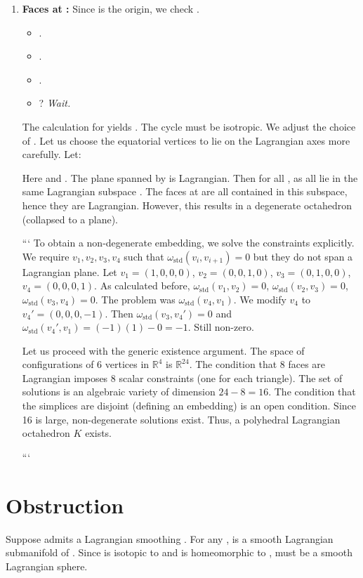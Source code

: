 \documentclass[11pt]{article}
\theoremstyle{definition}
\newcommand{\R}{\mathbb{R}}
\newcommand{\omegaStd}{\omega_{\mathrm{std}}}
\begin{document}
\begin{enumerate}
\item \textbf{Faces at :} Since  is the origin, we check .
\begin{itemize}
\item .
\item .
\item .
\item ? \emph{Wait.}
\end{itemize}
The calculation for  yields . The cycle  must be isotropic. We adjust the choice of .
Let us choose the equatorial vertices to lie on the Lagrangian axes more carefully. Let:



Here  and . The plane spanned by  is Lagrangian.
Then  for all , as all  lie in the same Lagrangian subspace .
The faces at  are all contained in this subspace, hence they are Lagrangian. However, this results in a degenerate octahedron (collapsed to a plane).

```
To obtain a non-degenerate embedding, we solve the constraints explicitly. We require $v_1, v_2, v_3, v_4$ such that $\omegaStd(v_i, v_{i+1}) = 0$ but they do not span a Lagrangian plane.
Let $v_1 = (1,0,0,0)$, $v_2 = (0,0,1,0)$, $v_3 = (0,1,0,0)$, $v_4 = (0,0,0,1)$.
As calculated before, $\omegaStd(v_1, v_2)=0$, $\omegaStd(v_2, v_3)=0$, $\omegaStd(v_3, v_4)=0$. The problem was $\omegaStd(v_4, v_1)$.
We modify $v_4$ to $v_4' = (0,0,0,-1)$. Then $\omegaStd(v_3, v_4') = 0$ and $\omegaStd(v_4', v_1) = (-1)(1) - 0 = -1$. Still non-zero.

Let us proceed with the generic existence argument. The space of configurations of 6 vertices in $\R^4$ is $\R^{24}$. The condition that 8 faces are Lagrangian imposes 8 scalar constraints (one for each triangle). The set of solutions is an algebraic variety of dimension $24 - 8 = 16$. The condition that the simplices are disjoint (defining an embedding) is an open condition. Since 16 is large, non-degenerate solutions exist. Thus, a polyhedral Lagrangian octahedron $K$ exists.

```

\end{enumerate}

\section{Obstruction}

Suppose  admits a Lagrangian smoothing . For any ,  is a smooth Lagrangian submanifold of . Since  is isotopic to  and  is homeomorphic to ,  must be a smooth Lagrangian sphere.
\end{document}
